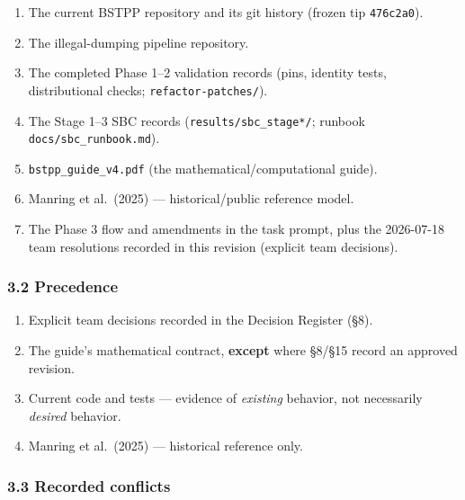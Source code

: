 \documentclass[
  10pt,
]{article}
\providecommand{\tightlist}{%
  \setlength{\itemsep}{0pt}\setlength{\parskip}{0pt}}
\begin{document}
\begin{enumerate}
\def\labelenumi{\arabic{enumi}.}
\tightlist
\item
  The current BSTPP repository and its git history (frozen tip \texttt{476c2a0}).
\item
  The illegal-dumping pipeline repository.
\item
  The completed Phase 1--2 validation records (pins, identity tests, distributional checks; \texttt{refactor-patches/}).
\item
  The Stage 1--3 SBC records (\texttt{results/sbc\_stage*/}; runbook \texttt{docs/sbc\_runbook.md}).
\item
  \texttt{bstpp\_guide\_v4.pdf} (the mathematical/computational guide).
\item
  Manring et al.~(2025) --- historical/public reference model.
\item
  The Phase 3 flow and amendments in the task prompt, plus the 2026-07-18 team resolutions recorded in this revision (explicit team decisions).
\end{enumerate}

\hypertarget{precedence}{%
\subsubsection{3.2 Precedence}\label{precedence}}

\begin{enumerate}
\def\labelenumi{\arabic{enumi}.}
\tightlist
\item
  Explicit team decisions recorded in the Decision Register (§8).
\item
  The guide's mathematical contract, \textbf{except} where §8/§15 record an approved revision.
\item
  Current code and tests --- evidence of \emph{existing} behavior, not necessarily \emph{desired} behavior.
\item
  Manring et al.~(2025) --- historical reference only.
\end{enumerate}

\hypertarget{recorded-conflicts}{%
\subsubsection{3.3 Recorded conflicts}\label{recorded-conflicts}}
\end{document}
